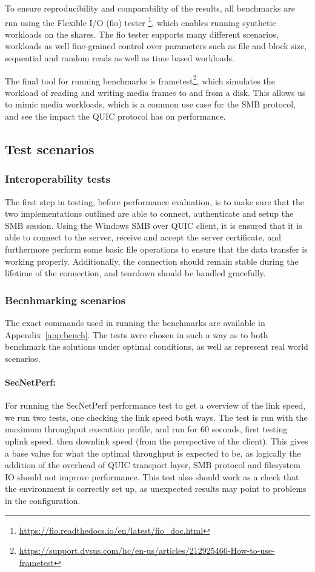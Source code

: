 \documentclass[english, 12pt, a4paper, elec, utf8, a-2b, online]{aaltothesis}
\begin{document}
To ensure reproducibility and comparability of the results, all benchmarks are run
using the Flexible I/O (fio) tester \footnote{\url{https://fio.readthedocs.io/en/latest/fio_doc.html}},
which enables running synthetic workloads on the shares. The fio tester supports
many different scenarios, workloads as well fine-grained control over parameters
such as file and block size, sequential and random reads as well as time based workloads.

The final tool for running benchmarks is frametest\footnote{\url{https://support.dvsus.com/hc/en-us/articles/212925466-How-to-use-frametest}}, which simulates the workload of
reading and writing media frames to and from a disk. This allows us to mimic media
workloads, which is a common use case for the SMB protocol, and see the impact
the QUIC protocol has on performance.

\subsection{Test scenarios}

\subsubsection{Interoperability tests}

The first step in testing, before performance evaluation, is to make sure that
the two implementations outlined are able to connect, authenticate and setup
the SMB session. Using the Windows SMB over QUIC client, it is ensured that it
is able to connect to the server, receive and accept the server certificate, and
furthermore perform some basic file operations to ensure that the data transfer is
working properly. Additionally, the connection should remain stable during the lifetime
of the connection, and teardown should be handled gracefully.

\subsubsection{Becnhmarking scenarios}

The exact commands used in running the benchmarks are available in Appendix~\ref{app:bench}.
The tests were chosen in such a way as to both benchmark the solutions under optimal conditions,
as well as represent real world scenarios.

\paragraph{SecNetPerf:}
For running the SecNetPerf performance test to get a overview of the link speed,
we run two tests, one checking the link speed both ways. The test is run with the maximum
throughput execution profile, and run for 60 seconds, first testing uplink speed,
then downlink speed (from the perspective of the client). This gives a base value for
what the optimal throughput is expected to be, as logically the addition of the
overhead of QUIC transport layer, SMB protocol and filesystem IO should not improve
performance. This test also should work as a check that the environment is correctly
set up, as unexpected results may point to problems in the configuration.
\end{document}
